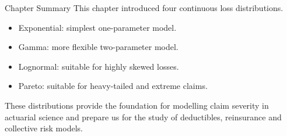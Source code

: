 \documentclass[
  ignorenonframetext,
  aspectratio=169,
]{beamer}
\providecommand{\tightlist}{%
  \setlength{\itemsep}{0pt}\setlength{\parskip}{0pt}}
\begin{document}
\begin{frame}{Chapter Summary}
\protect{}\label{chapter-summary}
This chapter introduced four continuous loss distributions.

\begin{itemize}
\tightlist
\item
  Exponential: simplest one-parameter model.
\item
  Gamma: more flexible two-parameter model.
\item
  Lognormal: suitable for highly skewed losses.
\item
  Pareto: suitable for heavy-tailed and extreme claims.
\end{itemize}

These distributions provide the foundation for modelling claim severity
in actuarial science and prepare us for the study of deductibles,
reinsurance and collective risk models.
\end{frame}
\end{document}

